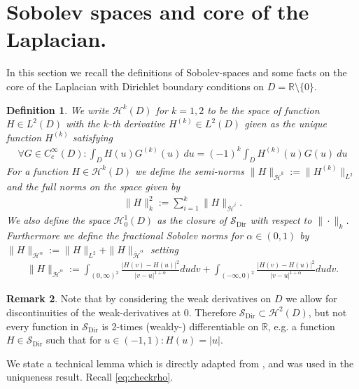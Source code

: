 \documentclass[a4paper, reqno, 12pt]{amsart}
\theoremstyle{plain}
\newtheorem{definition}{Definition}[section]
\theoremstyle{definition}
\newtheorem{remark}[definition]{Remark}
\newcommand{\R}{\mathbb{R}}
\newcommand{\Sdir}{\mathcal{S}_{\text{Dir}}}
\newcommand{\leander}[1]{\textcolor{red}{(L: #1)}}
\begin{document}
\section{Sobolev spaces and core of the Laplacian.} \label{sec:sobolev}
In this section we recall the definitions of Sobolev-spaces and some facts on the core of the Laplacian with Dirichlet boundary conditions on $D=\R\setminus\{0\}$.
\begin{definition} We write $\mathcal H^k(D)$ for $k=1,2$ to be the space of function $H \in L^2(D)$ with the $k$-th derivative $H^{(k)}\in L^2(D)$  given as the unique function $H^{(k)}$ satisfying
\begin{align*}
    \forall G\in C^{\infty}_c(D): \int_{D}H(u) G^{(k)}(u) \ du = (-1)^k \int_{D} H^{(k)}(u) G(u) \ du
\end{align*}
For a function $H\in\mathcal H^k(D)$ we define the  semi-norms $\|H\|_{\dot{\mathcal H}^{k}}:= \|H^{(k)}\|_{L^2}$ and the full norms on the space given by
\begin{align*}
    \|H\|_{k}^2 := \sum_{i = 1}^k\|H\|_{\dot{\mathcal H}^i}.
\end{align*}
We also define the space $\mathcal H^1_0(D)$ as the closure of $\Sdir$ 
with respect to $\|\cdot\|_k$. 
Furthermore we define the fractional Sobolev norms for $\alpha\in (0,1)$ by $\|H\|_{\mathcal H^{\alpha}}:= \|H\|_{L^2} + \|H\|_{\dot{\mathcal H}^{\alpha}}$ setting 
\begin{align*}
    \|H\|_{\dot{\mathcal H}^{\alpha}} := \int_{(0,\infty)^2} \frac{|H(v)-H(u)|^2}{|v-u|^{1+\alpha}} dudv + \int_{(-\infty,0)^2} \frac{|H(v)-H(u)|^2}{|v-u|^{1+\alpha}} dudv.
\end{align*}
\end{definition}
\begin{remark} Note that by considering the weak derivatives on $D$ we allow for discontinuities of the weak-derivatives at $0$. Therefore $\Sdir\subset \mathcal H^2(D)$, but not every function in $\Sdir$ is 2-times (weakly-) differentiable on $\R$, e.g. a function $H\in\Sdir$ such that for $u\in(-1,1): H(u) = |u|$.
\end{remark}

We state a technical lemma which is directly adapted from \cite[Lemma A.4]{GPP24}, and was used in the uniqueness result. Recall  \eqref{eq:checkrho}.
\end{document}
